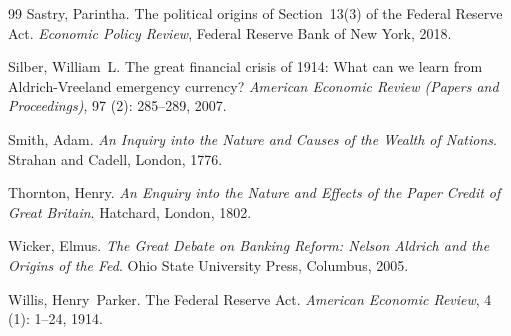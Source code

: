 \documentclass[12pt]{article}
\begin{document}
\begin{thebibliography}{99}
  Sastry, Parintha.
  \newblock The political origins of Section~13(3) of the Federal Reserve Act.
  \newblock \emph{Economic Policy Review}, Federal Reserve Bank of New York,
    2018.

  Silber, William~L.
  \newblock The great financial crisis of 1914: What can we learn from
    Aldrich-Vreeland emergency currency?
  \newblock \emph{American Economic Review (Papers and Proceedings)},
    97 (2): 285--289, 2007.

  Smith, Adam.
  \newblock \emph{An Inquiry into the Nature and Causes of the Wealth of
    Nations}.
  \newblock Strahan and Cadell, London, 1776.

  Thornton, Henry.
  \newblock \emph{An Enquiry into the Nature and Effects of the Paper Credit of
    Great Britain}.
  \newblock Hatchard, London, 1802.

  Wicker, Elmus.
  \newblock \emph{The Great Debate on Banking Reform: Nelson Aldrich and the
    Origins of the Fed}.
  \newblock Ohio State University Press, Columbus, 2005.

  Willis, Henry~Parker.
  \newblock The Federal Reserve Act.
  \newblock \emph{American Economic Review}, 4 (1): 1--24,
    1914.

\end{thebibliography}
\end{document}
